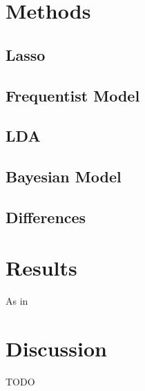 \documentclass[twoside,twocolumn]{article}
\begin{document}
\section{Methods}

\subsection{Lasso}

\subsection{Frequentist Model}

\subsection{LDA}

\subsection{Bayesian Model}

\subsection{Differences}


\section{Results}

As in \cite{zweifel_samarin_meusburger_alewell_2021}

\section{Discussion}

TODO


\printbibliography

\end{document}
